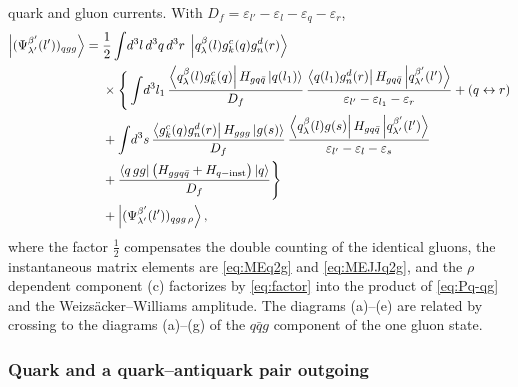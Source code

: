 \documentclass[11pt,a4paper]{article}
\numberwithin{equation}{section}
\newcommand{\eps}{\varepsilon}
\newcommand{\ket}[1]{\left|#1\right\rangle}
\newcommand{\bra}[1]{\left\langle#1\right|}
\newcommand{\qk}[3]{q^{#1}_{#2}(#3)}
\newcommand{\gl}[3]{g^{#1}_{#2}(#3)}
\begin{document}
quark and gluon currents. With $D_{f}=\eps_{l'}-\eps_{l}-\eps_{q}-\eps_{r}$,
\begin{align}
\ket{(\Psi^{\beta'}_{\lambda'}(l'))_{qgg}}=\;&\frac12\int\!d^{3}l\,d^{3}q\,d^{3}r\;\ket{\qk{\beta}{\lambda}{l}\gl{c}{k}{q}\gl{d}{n}{r}}
\nonumber\\&\times\Bigg\{\int\!d^{3}l_{1}\,\frac{\bra{\qk{\beta}{\lambda}{l}\gl{c}{k}{q}}H_{gq\bar q}\ket{q(l_{1})}}{D_{f}}\,
\frac{\bra{q(l_{1})\gl{d}{n}{r}}H_{gq\bar q}\ket{\qk{\beta'}{\lambda'}{l'}}}{\eps_{l'}-\eps_{l_{1}}-\eps_{r}}
+(q\leftrightarrow r)
\nonumber\\
&+\int\!d^{3}s\,\frac{\bra{\gl{c}{k}{q}\gl{d}{n}{r}}H_{ggg}\ket{g(s)}}{D_{f}}\,
\frac{\bra{\qk{\beta}{\lambda}{l}g(s)}H_{gq\bar q}\ket{\qk{\beta'}{\lambda'}{l'}}}{\eps_{l'}-\eps_{l}-\eps_{s}}
\nonumber\\
&+\frac{\bra{q\,gg}\big(H_{ggq\bar q}+H_{q-{\rm inst}}\big)\ket{q}}{D_{f}}\Bigg\}
\nonumber\\
&+\ket{(\Psi^{\beta'}_{\lambda'}(l'))_{qgg\,\rho}} ,
\label{eq:Pq-qgg}
\end{align}
where the factor $\tfrac12$ compensates the double counting of the identical gluons, the
instantaneous matrix elements are \eqref{eq:MEq2g} and \eqref{eq:MEJJq2g}, and the $\rho$ dependent
component (c) factorizes by \eqref{eq:factor} into the product of \eqref{eq:Pq-qg} and the
Weizs\"acker--Williams amplitude. The diagrams (a)--(e) are related by crossing to the diagrams
(a)--(g) of the $q\bar q g$ component of the one gluon state.

\subsubsection{Quark and a quark--antiquark pair outgoing}
\end{document}

